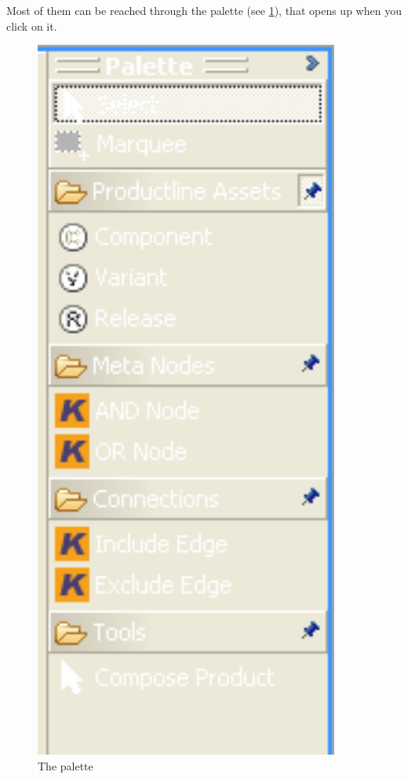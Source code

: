 Most of them can be reached through the palette (see \ref{palette}), that opens up when you click on it.

\begin{figure}[h!]
\begin{center}
\includegraphics[width=10cm]{palette.png}
   \caption{The palette}
\label{palette}
\end{center}
\end{figure}\par

